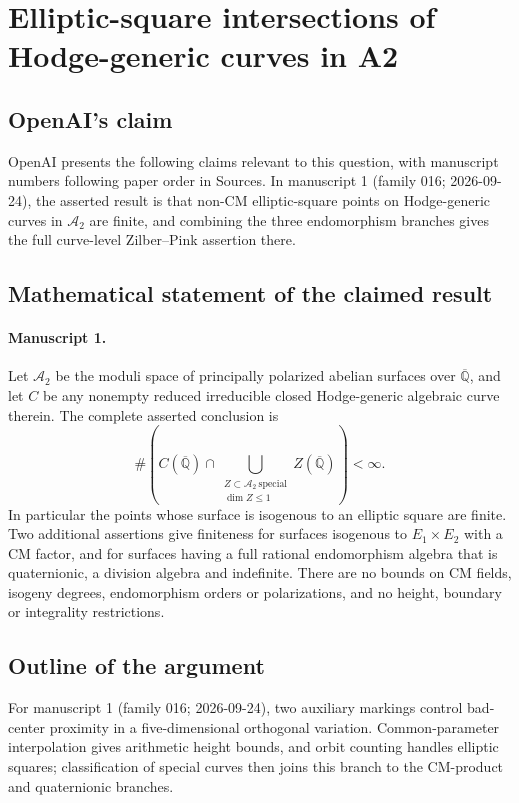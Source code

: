 \documentclass[11pt]{article}
\begin{document}
\section*{Elliptic-square intersections of Hodge-generic curves in A2}

\subsection{OpenAI's claim}
OpenAI presents the following claims relevant to this question, with manuscript numbers following paper order in Sources. In manuscript 1 (family 016; 2026-09-24), the asserted result is that non-CM elliptic-square points on Hodge-generic curves in $\mathcal A_2$ are finite, and combining the three endomorphism branches gives the full curve-level Zilber--Pink assertion there.

\subsection{Mathematical statement of the claimed result}
\paragraph{Manuscript 1.}
Let $\mathcal A_2$ be the moduli space of principally polarized abelian surfaces over $\overline{\mathbb Q}$, and let $C$ be any nonempty reduced irreducible closed Hodge-generic algebraic curve therein. The complete asserted conclusion is
\[
 \#\left(C(\overline{\mathbb Q})\cap
 \bigcup_{\substack{Z\subset\mathcal A_2\ \mathrm{special}\\\dim Z\le1}}
 Z(\overline{\mathbb Q})\right)<\infty.
\]
In particular the points whose surface is isogenous to an elliptic square are finite. Two additional assertions give finiteness for surfaces isogenous to $E_1\times E_2$ with a CM factor, and for surfaces having a full rational endomorphism algebra that is quaternionic, a division algebra and indefinite. There are no bounds on CM fields, isogeny degrees, endomorphism orders or polarizations, and no height, boundary or integrality restrictions.

\subsection{Outline of the argument}
For manuscript 1 (family 016; 2026-09-24), two auxiliary markings control bad-center proximity in a five-dimensional orthogonal variation. Common-parameter interpolation gives arithmetic height bounds, and orbit counting handles elliptic squares; classification of special curves then joins this branch to the CM-product and quaternionic branches.
\end{document}

